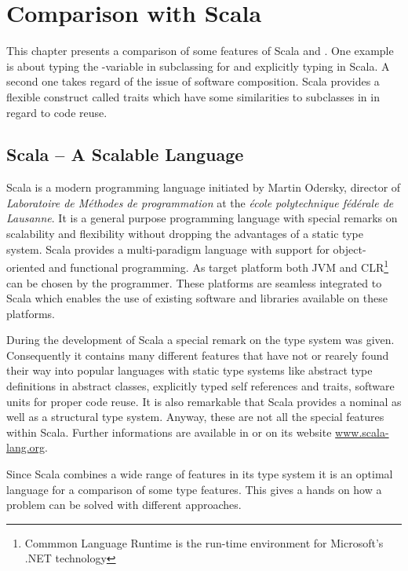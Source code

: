 \chapter{Comparison with Scala}
\label{sec:comparisonScala}
This chapter presents a comparison of some features of Scala and \ooplss.
One example is about typing the \self-variable in subclassing for
\ooplss and explicitly typing in Scala. A second one takes regard of the
issue of software composition. Scala provides a flexible construct called
traits which have some similarities to subclasses in \ooplss in regard to
code reuse.

\section{Scala -- A Scalable Language}
Scala is a modern programming language initiated by Martin Odersky,
director of \emph{Laboratoire de Méthodes de programmation} at the
\emph{école polytechnique fédérale de Lausanne}. It is a general
purpose programming language with special remarks on scalability
and flexibility without dropping the advantages of a static type
system. Scala provides a multi-paradigm language with support for
object-oriented and functional programming. As target platform both JVM
and CLR\footnote{Commmon Language Runtime is the run-time environment
for Microsoft's .NET technology} can be chosen by the programmer. These
platforms are seamless integrated to Scala which enables the use of
existing software and libraries available on these platforms.

During the development of Scala a special remark on the type system was
given. Consequently it contains many different features that have not or
rearely found their way into popular languages with static type systems
like abstract type definitions in abstract classes, explicitly typed self
references and traits, software units for proper code reuse. It is also
remarkable that Scala provides a nominal as well as a structural
type system. Anyway, these are not all the special features within
Scala. Further informations are available in
\cite{odersky_scala_2010,odersky_programming_2008} or on its website
\href{http://www.scala-lang.org/}{www.scala-lang.org}.

Since Scala combines a wide range of features in its type system it is
an optimal language for a comparison of some type features. This gives
a hands on how a problem can be solved with different approaches.

